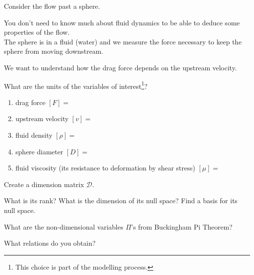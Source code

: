 \documentclass{workbook}
\begin{document}
\begin{slide}

\question

\begin{problem}

Consider the flow past a sphere.

\begin{center}
\end{center}

You don't need to know much about fluid dynamics to be able to deduce some properties of the flow. \\

The sphere is in a fluid (water) and we measure the force necessary to keep the sphere from moving downstream.

We want to understand how the drag force depends on the upstream velocity.
\end{problem}

\begin{parts}
	\item What are the units of the variables of interest\footnote{This choice is part of the modelling process.}?
	\begin{enumerate}
		\item drag force $[F]=$
		\item upstream velocity $[v]=$
		\item fluid density $[\rho]=$
		\item sphere diameter $[D]=$
		\item fluid viscosity (its resistance to deformation by shear stress) $[\mu]= $
	\end{enumerate}
	\item Create a dimension matrix $\mathcal{D}$.
	\item What is its rank? What is the dimension of its null space? Find a basis for its null space.
	\item What are the non-dimensional variables $\Pi$'s from Buckingham Pi Theorem?
	\item What relations do you obtain?
		
\end{parts}
	
\end{slide}
\end{document}
